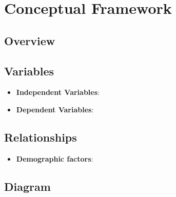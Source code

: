 \section{Conceptual Framework}

\subsection*{Overview}

\subsection*{Variables}

\begin{itemize}
    \item \textbf{Independent Variables}:
    
    
    \item \textbf{Dependent Variables}:
    
\end{itemize}

\subsection*{Relationships}


\begin{itemize}
    \item \textbf{Demographic factors}:
\end{itemize}

\subsection*{Diagram}


